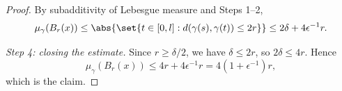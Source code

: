 \begin{proof}
  By subadditivity of Lebesgue measure and Steps 1--2,
  \[
    \mu_\gamma(B_r(x)) \leq \abs{\set{t \in [0,l] : d(\gamma(s),\gamma(t)) \leq 2r}}
    \leq 2\delta + 4\epsilon^{-1}r
    .
  \]

  \emph{Step 4: closing the estimate.} Since $r \geq \delta/2$, we have $\delta \leq 2r$, so
  $2\delta \leq 4r$. Hence
  \[
    \mu_\gamma(B_r(x)) \leq 4r + 4\epsilon^{-1}r = 4(1+\epsilon^{-1})r
    ,
  \]
  which is the claim. \qedhere
\end{proof}
